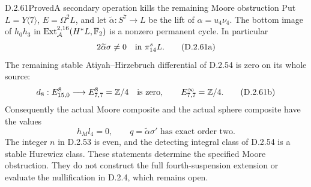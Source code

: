 \begin{claim}{D.2.61}{Proved}{A secondary operation kills the remaining Moore obstruction}
Put $L=Y\langle7\rangle$, $E=\Omega^2L$, and let
$\widetilde\alpha:S^7\to L$ be the lift of $\alpha=u_4\nu_4$.
The bottom image of $h_0h_3$ in
$\operatorname{Ext}_{\mathcal A}^{2,16}(H^*L,\mathbb F_2)$ is
a nonzero permanent cycle.  In particular
\[
                 2\widetilde\alpha\sigma\ne0
                       \quad\hbox{in }\pi_{14}^sL.
                 \tag{D.2.61a}
\]
The remaining stable Atiyah--Hirzebruch differential of
D.2.54 is zero on its whole source:
\[
 d_8:E^8_{15,0}\longrightarrow E^8_{7,7}=\mathbb Z/4
       \quad\hbox{is zero},\qquad E^\infty_{7,7}=\mathbb Z/4.
       \tag{D.2.61b}
\]
Consequently the actual Moore composite and the actual
sphere composite have the values
\[
                h_Ml_4=0,\qquad
                q=\widetilde\alpha\sigma'
                      \text{ has exact order two}.
                \tag{D.2.61c}
\]
The integer $n$ in D.2.53 is even, and the detecting
integral class of D.2.54 is a stable Hurewicz class.
These statements determine the specified Moore obstruction.
They do not construct the full fourth-suspension extension
or evaluate the nullification in D.2.4, which remains open.
\end{claim}
